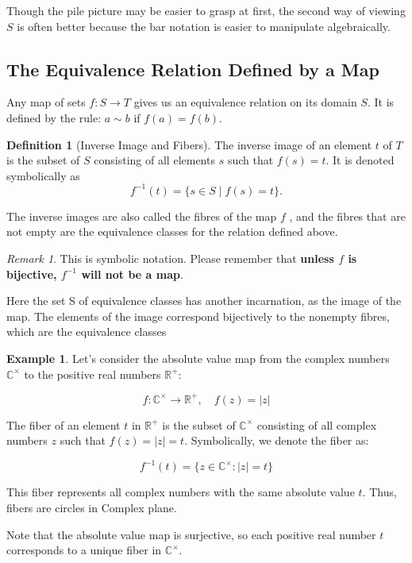 \documentclass[
]{book}
\theoremstyle{definition}
\newtheorem{definition}{Definition}[chapter]
\theoremstyle{definition}
\newtheorem{example}{Example}[chapter]
\theoremstyle{definition}
\theoremstyle{definition}
\theoremstyle{remark}
\newtheorem*{remark}{Remark}
\begin{document}
Though the pile picture may be easier to grasp at first, the second way of viewing \(S\) is often better because the bar notation is easier to manipulate algebraically.

\hypertarget{the-equivalence-relation-defined-by-a-map}{%
\subsection{The Equivalence Relation Defined by a Map}\label{the-equivalence-relation-defined-by-a-map}}

Any map of sets \(f : S \to T\) gives us an equivalence relation on its domain \(S\). It is defined by the rule: \(a \sim b\) if \(f(a) = f(b)\).

\begin{definition}[Inverse Image  and Fibers]
\protect\hypertarget{def:unnamed-chunk-27}{}\label{def:unnamed-chunk-27}The inverse image of an element \(t\) of \(T\) is the subset of \(S\) consisting of all elements \(s\) such that \(f(s) = t\). It is denoted symbolically as
\begin{equation}
f^{-1}(t) = \{s \in S \mid f(s) = t\}.
\end{equation}

The inverse images are also called the fibres of the map \(f\) , and the fibres that are not empty are the equivalence classes for the relation defined above.
\end{definition}

\begin{remark}
This is symbolic notation. Please remember that \textbf{unless \(f\) is bijective, \(f^{-1}\) will not be a map}.
\end{remark}

Here the set S of equivalence classes has another incarnation, as the image of the map.
The elements of the image correspond bijectively to the nonempty fibres, which are the
equivalence classes

\begin{example}
\protect\hypertarget{exm:unnamed-chunk-29}{}\label{exm:unnamed-chunk-29}Let's consider the absolute value map from the complex numbers \(\mathbb{C}^\times\) to the positive real numbers \(\mathbb{R}^+\):

\[ f: \mathbb{C}^\times \to \mathbb{R}^+, \quad f(z) = |z| \]

The fiber of an element \(t\) in \(\mathbb{R}^+\) is the subset of \(\mathbb{C}^\times\) consisting of all complex numbers \(z\) such that \(f(z) = |z| = t\). Symbolically, we denote the fiber as:

\[ f^{-1}(t) = \{ z \in \mathbb{C}^\times : |z| = t \} \]

This fiber represents all complex numbers with the same absolute value \(t\). Thus, fibers are circles in Complex plane.

Note that the absolute value map is surjective, so each positive real number \(t\) corresponds to a unique fiber in \(\mathbb{C}^\times\).
\end{example}
\end{document}

